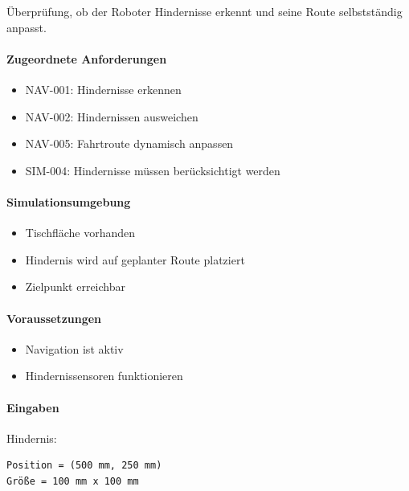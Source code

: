 \documentclass[
  a4paper,
  12pt,
  DIV=12,        %
  parskip=half,  %
  headings=small %
]{scrartcl}
\theoremstyle{definition}
\providecommand{\tightlist}{%
  \setlength{\itemsep}{0pt}\setlength{\parskip}{0pt}}
\theoremstyle{definition}
\begin{document}
Überprüfung, ob der Roboter Hindernisse erkennt und seine Route
selbstständig anpasst.

\paragraph{Zugeordnete
Anforderungen}\label{zugeordnete-anforderungen-17}

\begin{itemize}
\tightlist
\item
  NAV-001: Hindernisse erkennen
\item
  NAV-002: Hindernissen ausweichen
\item
  NAV-005: Fahrtroute dynamisch anpassen
\item
  SIM-004: Hindernisse müssen berücksichtigt werden
\end{itemize}

\paragraph{Simulationsumgebung}\label{simulationsumgebung-2}

\begin{itemize}
\tightlist
\item
  Tischfläche vorhanden
\item
  Hindernis wird auf geplanter Route platziert
\item
  Zielpunkt erreichbar
\end{itemize}

\paragraph{Voraussetzungen}\label{voraussetzungen-17}

\begin{itemize}
\tightlist
\item
  Navigation ist aktiv
\item
  Hindernissensoren funktionieren
\end{itemize}

\paragraph{Eingaben}\label{eingaben-16}

Hindernis:

\begin{verbatim}
Position = (500 mm, 250 mm)
Größe = 100 mm x 100 mm
\end{verbatim}
\end{document}
